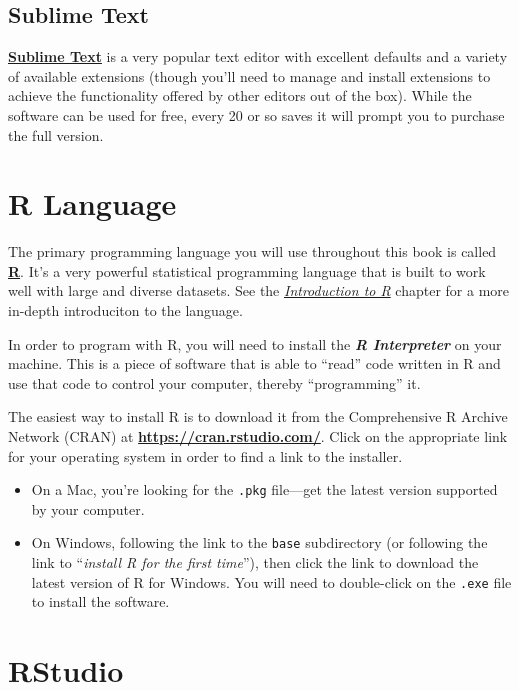 \documentclass[]{book}
\providecommand{\tightlist}{%
  \setlength{\itemsep}{0pt}\setlength{\parskip}{0pt}}
\theoremstyle{definition}
\theoremstyle{definition}
\theoremstyle{remark}
\begin{document}
\subsection{Sublime Text}\label{sublime-text}

\href{https://www.sublimetext.com/3}{\textbf{Sublime Text}} is a very
popular text editor with excellent defaults and a variety of available
extensions (though you'll need to manage and install extensions to
achieve the functionality offered by other editors out of the box).
While the software can be used for free, every 20 or so saves it will
prompt you to purchase the full version.

\section{R Language}\label{r-language}

The primary programming language you will use throughout this book is
called \href{https://www.r-project.org/}{\textbf{R}}. It's a very
powerful statistical programming language that is built to work well
with large and diverse datasets. See the
\emph{\protect\hyperlink{r-intro}{Introduction to R}} chapter for a more
in-depth introduciton to the language.

In order to program with R, you will need to install the \textbf{\emph{R
Interpreter}} on your machine. This is a piece of software that is able
to ``read'' code written in R and use that code to control your
computer, thereby ``programming'' it.

The easiest way to install R is to download it from the Comprehensive R
Archive Network (CRAN) at \textbf{\url{https://cran.rstudio.com/}}.
Click on the appropriate link for your operating system in order to find
a link to the installer.

\begin{itemize}
\tightlist
\item
  On a Mac, you're looking for the \texttt{.pkg} file---get the latest
  version supported by your computer.
\item
  On Windows, following the link to the \texttt{base} subdirectory (or
  following the link to ``\emph{install R for the first time}''), then
  click the link to download the latest version of R for Windows. You
  will need to double-click on the \texttt{.exe} file to install the
  software.
\end{itemize}

\section{RStudio}\label{rstudio}
\end{document}
